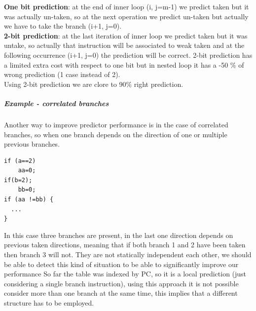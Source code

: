 \textbf{One bit prediction}: at the end of inner loop (i, j=m-1) we predict
taken but it was actually un-taken, so at the next operation we predict un-taken
but actually we have to take the branch (i+1, j=0).\\
\textbf{2-bit prediction}: at the last iteration of inner loop we predict taken
but it was untake, so actually that instruction will be associated to weak taken
and at the following occurrence (i+1, j=0) the prediction will be correct. 2-bit
prediction has a limited extra cost with respect to one bit but in nested loop
it has a -50 \% of wrong prediction (1 case instead of 2).\\
Using 2-bit prediction we are clore to 90\% right prediction.
\subparagraph{Example - correlated branches}
Another way to improve predictor performance is in the case of correlated
branches, so when one branch depends on the direction of one or multiple
previous branches.
\begin{verbatim}
if (a==2)
    aa=0;
if(b=2);
    bb=0;
if (aa !=bb) {
  ...
}
\end{verbatim}
In this case three branches are present, in the last one direction depends on
previous taken directions, meaning that if both branch 1 and 2 have been taken
then branch 3 will not.
They are not statically independent each other, we should be able to detect this
kind of situation to be able to significantly improve our performance So far the
table was indexed by PC, so it is a local prediction (just considering a single
branch instruction), using this approach it is not possible consider more than
one branch at the same time, this implies that a different structure has to be
employed.
